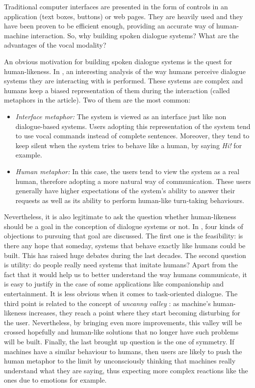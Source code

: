 	Traditional computer interfaces are presented in the form of controls in an application (text boxes, buttons) or web pages. They are heavily used and they have been proven to be efficient enough, providing an accurate way of human-machine interaction. So, why building spoken dialogue systems? What are the advantages of the vocal modality?
		
	An obvious motivation for building spoken dialogue systems is the quest for human-likeness. In \cite{Edlund2008}, an interesting analysis of the way humans perceive dialogue systems they are interacting with is performed. These systems are complex and humans keep a biased representation of them during the interaction (called metaphors in the article). Two of them are the most common:
	
	\begin{itemize}
		\item \textit{Interface metaphor:} The system is viewed as an interface just like non dialogue-based systems. Users adopting this representation of the system tend to use vocal commands instead of complete sentences. Moreover, they tend to keep silent when the system tries to behave like a human, by saying \textit{Hi!} for example.
		\item \textit{Human metaphor:} In this case, the users tend to view the system as a real human, therefore adopting a more natural way of communication. These users generally have higher expectations of the system's ability to answer their requests as well as its ability to perform human-like turn-taking behaviours.
	\end{itemize}
	
	Nevertheless, it is also legitimate to ask the question whether human-likeness should be a goal in the conception of dialogue systems or not. In \cite{Edlund2008}, four kinds of objections to pursuing that goal are discussed. The first one is the feasibility: is there any hope that someday, systems that behave exactly like humans could be built. This has raised huge debates during the last decades. The second question is utility: do people really need systems that imitate humans? Apart from the fact that it would help us to better understand the way humans communicate, it is easy to justify in the case of some applications like companionship and entertainment. It is less obvious when it comes to task-oriented dialogue. The third point is related to the concept of \textit{uncanny valley} \cite{Mori1970}: as machine's human-likeness increases, they reach a point where they start becoming disturbing for the user. Nevertheless, by bringing even more improvements, this valley will be crossed hopefully and human-like solutions that no longer have such problems will be built. Finally, the last brought up question is the one of symmetry. If machines have a similar behaviour to humans, then users are likely to push the human metaphor to the limit by unconsciously thinking that machines really understand what they are saying, thus expecting more complex reactions like the ones due to emotions for example.

